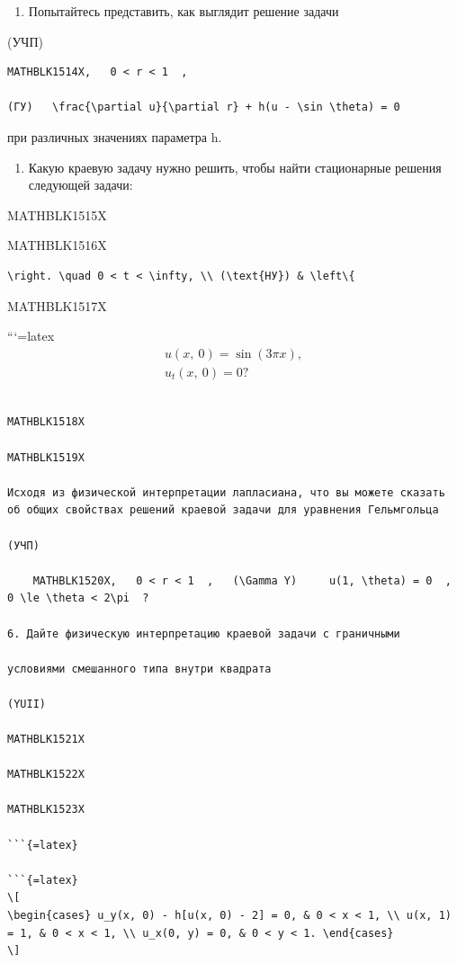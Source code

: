 \documentclass[
]{article}
\providecommand{\tightlist}{%
  \setlength{\itemsep}{0pt}\setlength{\parskip}{0pt}}
\begin{document}
\begin{enumerate}
\def\labelenumi{\arabic{enumi}.}
\setcounter{enumi}{2}
\tightlist
\item
  Попытайтесь представить, как выглядит решение задачи
\end{enumerate}

(УЧП)

\begin{verbatim}
MATHBLK1514X,   0 < r < 1  ,

(ГУ)   \frac{\partial u}{\partial r} + h(u - \sin \theta) = 0 
\end{verbatim}

при различных значениях параметра h.

\begin{enumerate}
\def\labelenumi{\arabic{enumi}.}
\setcounter{enumi}{3}
\tightlist
\item
  Какую краевую задачу нужно решить, чтобы найти стационарные решения
  следующей задачи:
\end{enumerate}

MATHBLK1515X

MATHBLK1516X

\begin{verbatim}
\right. \quad 0 < t < \infty, \\ (\text{НУ}) & \left\{
\end{verbatim}

MATHBLK1517X

```{=latex}
\[
\begin{aligned} u\left(x, \ 0\right) = \sin\left(3\pi x\right), \\ u_t\left(x, \ 0\right) = 0? \end{aligned}
\]

\begin{verbatim}

MATHBLK1518X

MATHBLK1519X

Исходя из физической интерпретации лапласиана, что вы можете сказать об общих свойствах решений краевой задачи для уравнения Гельмгольца

(УЧП)

    MATHBLK1520X,   0 < r < 1  ,   (\Gamma Y)     u(1, \theta) = 0  ,   0 \le \theta < 2\pi  ?

6. Дайте физическую интерпретацию краевой задачи с граничными

условиями смешанного типа внутри квадрата

(YUII)

MATHBLK1521X

MATHBLK1522X

MATHBLK1523X

```{=latex}

```{=latex}
\[
\begin{cases} u_y(x, 0) - h[u(x, 0) - 2] = 0, & 0 < x < 1, \\ u(x, 1) = 1, & 0 < x < 1, \\ u_x(0, y) = 0, & 0 < y < 1. \end{cases}
\]
\end{verbatim}
\end{document}
